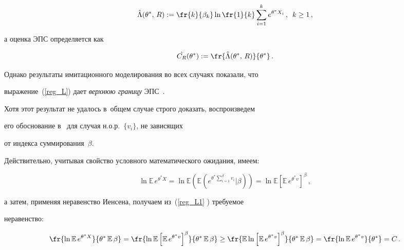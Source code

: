 \begin{equation*}


\hat \Lambda(\theta^*,\,R) :=


  \fr{k}{\beta_k}   \ln\fr{1}{k} \sum\limits_{i=1}^{k} e^{\theta^* X_i}\,,\enskip


  k\ge1\,,




\end{equation*}


а  оценка ЭПС  определяется как


\begin{equation}


\hat{C_R}(\theta^*):=\fr{\hat \Lambda({\theta}^*,\,R)}{{\theta}^*}\,.


\label{reg_C}


\end{equation}


Однако результаты имитационного моделирования во всех случаях показали, что


выражение~(\ref{reg_L})  дает  {\it верхнюю границу}  ЭПС~\cite{smrlo, EB14}.


Хотя этот результат не удалось в~общем случае строго доказать,  воспроизведем 


его обоснование  в~\cite{EB14} для случая   н.о.р.~$\{v_i\}$, не зависящих 


от индекса суммирования~$\beta$.


Действительно, учитывая свойство условного математического ожидания, имеем:


\begin{equation*}


 \ln \mathbb{E} \,e ^{\theta^* X}=


 \ln \mathbb{E} \left(\mathbb{E} \left(e^{\theta^* \sum\nolimits_{i=1}^\beta


 v_i}|\beta\right)\right)=


 \ln \mathbb{E} \left[\mathbb{E} \,e^{\theta^* v}\right]^\beta\,,


\end{equation*}


а затем, применяя неравенство Иенсена, получаем из~(\ref{reg_L1} ) требуемое 


неравенство:


\begin{equation}


\label{ineq}


\fr{\ln \mathbb{E}\, e^{\theta^*  X}}{\theta^*\, \mathbb{E}\,\beta}=


\fr{\ln \mathbb{E} \left[\mathbb{E}\, e^{\theta^* v}\right]^\beta}{\theta^*\,\mathbb{E}\, 


\beta}\ge\fr{\mathbb{E} \ln \left[\mathbb{E}\, e^{\theta^*  v}\right]^\beta}


{\theta^*\,\mathbb{E} \,\beta}=


\fr{\ln\mathbb{E} \,e^{\theta^*v}}{\theta^*}=C\,.




\end{equation}


